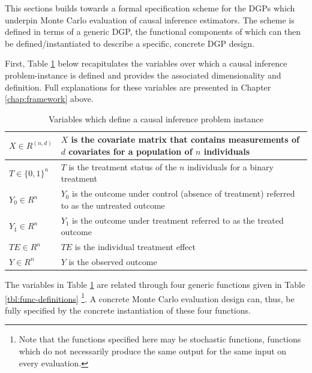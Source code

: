 \documentclass[../main.tex]{subfiles}
\begin{document}
This sections builds towards a formal specification scheme for the DGPs which underpin Monte Carlo evaluation of causal inference estimators. The scheme is defined in terms of a generic DGP, the functional components of which can then be defined/instantiated to describe a specific, concrete DGP design.\par

\vspace{\baselineskip}

First, Table \ref{tbl:var-definitions} below recapitulates the variables over which a causal inference problem-instance is defined and provides the associated dimensionality and  definition. Full explanations for these variables are presented in Chapter \ref{chap:framework} above.\par

\vspace{\baselineskip}

\begin{table}[H]
\begin{tabular}{|p{1in}|p{4in}|}
\hline

$X \in R^{ \left( n, d \right) }$ & $X$ is the covariate matrix that contains measurements of $d$ covariates for a population of $n$ individuals \\ \hline

$T \in \{0, 1\}^n$ & $T$ is the treatment status of the $n$ individuals for a binary treatment \\ \hline

$Y_0 \in R^n$ & $Y_0$ is the outcome under control (absence of treatment) referred to as the untreated outcome \\ \hline

$Y_1 \in R^n$ & $Y_1$ is the outcome under treatment referred to as the treated outcome \\ \hline

$TE \in R^n$ & $TE$ is the individual treatment effect \\ \hline

$Y \in R^n$ & $Y$ is the observed outcome \\ \hline
\end{tabular}

\caption{Variables which define a causal inference problem instance}
\label{tbl:var-definitions}
\end{table}

\vspace{\baselineskip}

The variables in Table \ref{tbl:var-definitions} are related through four generic functions given in Table \ref{tbl:func-definitions} \footnote{Note that the functions specified here may be stochastic functions, functions which do not necessarily produce the same output for the same input on every evaluation.}. A concrete Monte Carlo evaluation design can, thus, be fully specified by the concrete instantiation of these four functions.\par
\end{document}
